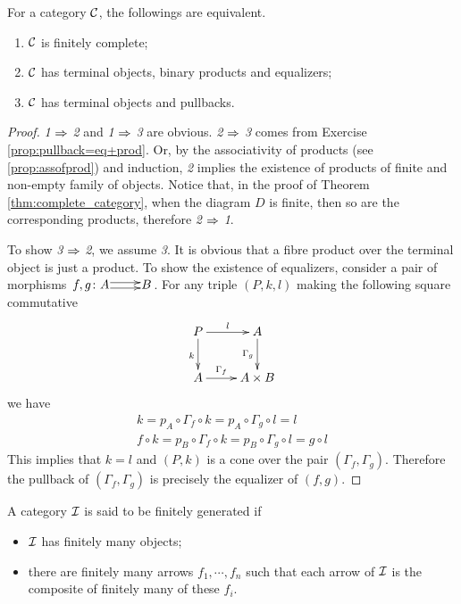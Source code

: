   \begin{prop}
    For a category ${\cal C}$, the followings are equivalent.
    \begin{enumerate}
      \item ${\cal C}$ is finitely complete;
      \item ${\cal C}$ has terminal objects, binary products and equalizers;
      \item ${\cal C}$ has terminal objects and pullbacks.
    \end{enumerate}
  \end{prop}
  \begin{proof}
    \emph{1} $\Rightarrow$ \emph{2} and \emph{1} $\Rightarrow$ \emph{3} are obvious. \emph{2} $\Rightarrow$ \emph{3} comes from Exercise \ref{prop:pullback=eq+prod}.
    Or, by the associativity of products (see \ref{prop:assofprod}) and induction, \emph{2} implies the existence of products of finite and non-empty family of objects. Notice that, in the proof of Theorem \ref{thm:complete_category}, when the diagram $D$ is finite, then so are the corresponding products, therefore \emph{2} $\Rightarrow$ \emph{1}.

    To show \emph{3} $\Rightarrow$ \emph{2}, we assume \emph{3}. It is obvious that a fibre product over the terminal object is just a product. To show the existence of equalizers, consider a pair of morphisms $\xymatrix@1{f,g\colon A\ar@<0.5ex>[r]\ar@<-0.5ex>[r]&B}$.
    For any triple $(P,k,l)$ making the following square commutative
    \begin{displaymath}
    \xymatrix{
      P\ar[r]^{l}\ar[d]_{k}&A\ar[d]_-{\Gamma_g}\\
      A\ar[r]^-{\Gamma_f}&A\times B
    }
    \end{displaymath}
    we have
    \begin{gather*}
      k = p_A\circ\Gamma_f\circ k = p_A\circ\Gamma_g\circ l = l \\
      f\circ k = p_B\circ\Gamma_f\circ k = p_B\circ\Gamma_g\circ l = g\circ l
    \end{gather*}
    This implies that $k=l$ and $(P,k)$ is a cone over the pair $(\Gamma_f,\Gamma_g)$.
    Therefore the pullback of $(\Gamma_f,\Gamma_g)$ is precisely the equalizer of $(f,g)$.
  \end{proof}

  \begin{defn}
    A category ${\cal I}$ is said to be finitely generated if
    \begin{itemize}
      \item ${\cal I}$ has finitely many objects;
      \item there are finitely many arrows $f_1,\cdots,f_n$ such that each arrow of ${\cal I}$ is the composite of finitely many of these $f_i$.
    \end{itemize}
 \end{defn}

